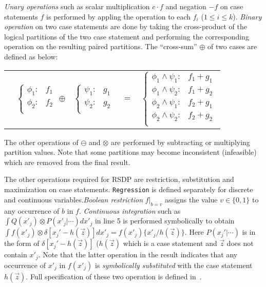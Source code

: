 \emph{Unary operations} such as scalar multiplication $c\cdot f$ %
and negation $-f$ on case statements $f$ is performed by appling the operation to each
$f_i$ ($1 \leq i \leq k$). 
\emph{Binary operation} on two case statements are done by taking the cross-product
of the logical partitions of the two case statement and performing the
corresponding operation on the resulting paired partitions.  
The ``cross-sum'' $\oplus$ of two cases are defined as below:

{\footnotesize 
\begin{center}
\begin{tabular}{r c c c l}
&
\hspace{-6mm} 
  $\begin{cases}
    \phi_1: & f_1 \\ 
    \phi_2: & f_2 \\ 
  \end{cases}$
$\oplus$
&
\hspace{-4mm}
  $\begin{cases}
    \psi_1: & g_1 \\ 
    \psi_2: & g_2 \\ 
  \end{cases}$
&
\hspace{-2mm} 
$ = $
&
\hspace{-2mm}
  $\begin{cases}
  \phi_1 \wedge \psi_1: & f_1 + g_1 \\ 
  \phi_1 \wedge \psi_2: & f_1 + g_2 \\ 
  \phi_2 \wedge \psi_1: & f_2 + g_1 \\ 
  \phi_2 \wedge \psi_2: & f_2 + g_2 \\ 
  \end{cases}$
\end{tabular}
\end{center}
}
\normalsize

The other operations of $\ominus$ and $\otimes$ are performed by subtracting or multiplying partition values.  Note that some partitions may become inconsistent (infeasible)  which are removed from the final result. 

The other operations required for RSDP are restriction, substitution and maximization on case statements.  
\texttt{Regression} is defined separately for discrete and continuous variables.\emph{Boolean restriction} $f|_{b=v}$ assigns the value $v \in \{ 0,1 \}$ to any occurrence of $b$ in $f$. \emph{Continuous integration} such as $\int Q(x'_j) \otimes P(x'_j|\cdots) dx'_j$ in line 5 is performed symbolically to obtain $\int f(x'_j) \otimes \delta[x_j' - h(\vec{z})] dx'_j = f(x'_j) \{ x'_j / h(\vec{z}) \}$. Here $P(x_j'|\cdots)$ is in the form of $\delta[x_j' - h(\vec{z})]$ ($h(\vec{z})$ which is a case statement and $\vec{z}$ does not contain $x'_j$. Note that the latter operation in the result indicates that any occurrence of $x'_j$ in $f(x'_j)$ is \emph{symbolically substituted} with the case statement $h(\vec{z})$. Full specification of these two operation is defined in~\cite{sanner_uai11}. 

